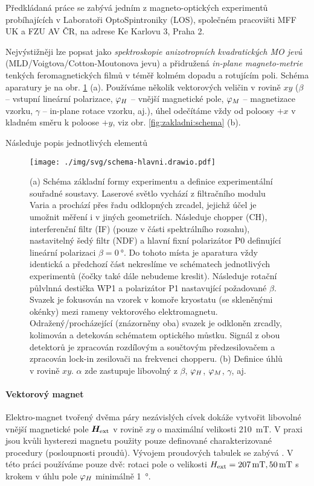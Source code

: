 Předkládaná práce se zabývá jedním z magneto-optických experimentů probíhajících v Laboratoři OptoSpintroniky (LOS), společném pracovišti MFF UK a FZU AV ČR, na adrese Ke Karlovu 3, Praha 2.

Nejvýstižněji lze popsat jako \emph{spektroskopie anizotropních kvadratických MO jevů} (MLD/Voigtova/Cotton-Moutonova jevu) a přidružená \emph{in-plane magneto-metrie} tenkých feromagnetických filmů v téměř kolmém dopadu a rotujícím poli.
Schéma aparatury je na obr. \ref{fig:zakladni-schema} (a).
Používáme několik vektorových veličin v rovině $xy$ ($\beta$ -- vstupní lineární polarizace, $\varphi_H$ -- vnější magnetické pole, $\varphi_M$ -- magnetizace vzorku, $\gamma$ -- in-plane rotace vzorku, aj.), úhel odečítáme vždy od poloosy $+x$ v kladném směru k poloose $+y$, viz obr. \ref{fig:zakladni:schema} (b).

Následuje popis jednotlivých elementů

\begin{figure}[htbp]
    \centering
    \texttt{[image: ./img/svg/schema-hlavni.drawio.pdf]}
    \caption{(a) Schéma základní formy experimentu a definice experimentální souřadné soustavy.
    Laserové světlo vychází z filtračního modulu Varia a prochází přes řadu odklopných zrcadel, jejichž účel je umožnit měření i v jiných geometriích.
Následuje chopper (CH), interferenční filtr (IF) (pouze v části spektrálního rozsahu), nastavitelný šedý filtr (NDF) a hlavní fixní polarizátor P0 definující lineární polarizaci $\beta=\SI{0}{\degree}$.
Do tohoto místa je aparatura vždy identická a předchozí část nekreslíme ve schématech jednotlivých experimentů (čočky také dále nebudeme kreslit).
Následuje rotační půlvlnná destička WP1 a polarizátor P1 nastavující požadované $\beta$.
Svazek je fokusován na vzorek v komoře kryostatu (se skleněnými okénky) mezi rameny vektorového elektromagnetu.
Odražený/procházející (znázorněny oba) svazek je odkloněn zrcadly, kolimován a detekován schématem optického můstku.
Signál z obou detektorů je zpracován rozdílovým a součtovým předzesilovačem a zpracován lock-in zesilovači na frekvenci chopperu.
(b) Definice úhlů v rovině $xy$. $\alpha$ zde zastupuje libovolný z $\beta$, $\varphi_H$, $\varphi_M$, $\gamma$, aj.}
    \label{fig:zakladni-schema}
\end{figure}

\paragraph{Vektorový magnet}
Elektro-magnet tvořený dvěma páry nezávislých cívek dokáže vytvořit libovolné vnější magnetické pole $\bm{H}_\textrm{ext}$ v rovině $xy$ o maximální velikosti \SI{210}{\milli\tesla}.
V praxi jsou kvůli hysterezi magnetu použity pouze definované charakterizované procedury (posloupnosti proudů).
Vývojem proudových tabulek se zabývá \cite{kimakCharakterizaciaDvojdimenzionalnehoElektromagnetu2017,kimakOptickaSpektroskopieAntiferomagnetu2019}.
V této práci používáme pouze dvě: rotaci pole o velikosti $H_\textrm{ext}=\SI{207}{\milli\tesla}, \SI{50}{\milli\tesla}$ s krokem v úhlu pole $\varphi_H$ minimálně \SI{1}{\degree}.

